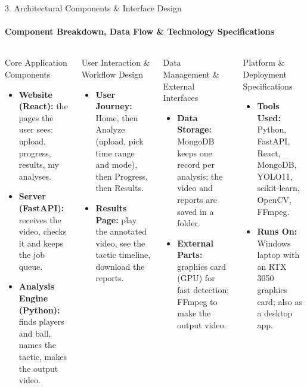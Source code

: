 \documentclass[aspectratio=169, 11pt]{beamer}
\begin{document}
\begin{frame}{3. Architectural Components \& Interface Design}
    \framesubtitle{Component Breakdown, Data Flow \& Technology Specifications}
\begin{columns}[T]
\begin{block}{Core Application Components}
\scriptsize
\begin{itemize}
  \item \textbf{Website (React):} the pages the user sees: upload, progress, results, my analyses.
  \item \textbf{Server (FastAPI):} receives the video, checks it and keeps the job queue.
  \item \textbf{Analysis Engine (Python):} finds players and ball, names the tactic, makes the output video.
\end{itemize}
\end{block}
\begin{block}{User Interaction \& Workflow Design}
\scriptsize
\begin{itemize}
  \item \textbf{User Journey:} Home, then Analyze (upload, pick time range and mode), then Progress, then Results.
  \item \textbf{Results Page:} play the annotated video, see the tactic timeline, download the reports.
\end{itemize}
\end{block}
\begin{block}{Data Management \& External Interfaces}
\scriptsize
\begin{itemize}
  \item \textbf{Data Storage:} MongoDB keeps one record per analysis; the video and reports are saved in a folder.
  \item \textbf{External Parts:} graphics card (GPU) for fast detection; FFmpeg to make the output video.
\end{itemize}
\end{block}
\begin{block}{Platform \& Deployment Specifications}
\scriptsize
\begin{itemize}
  \item \textbf{Tools Used:} Python, FastAPI, React, MongoDB, YOLO11, scikit-learn, OpenCV, FFmpeg.
  \item \textbf{Runs On:} Windows laptop with an RTX 3050 graphics card; also as a desktop app.
\end{itemize}
\end{block}
\end{columns}
\end{frame}
\end{document}
